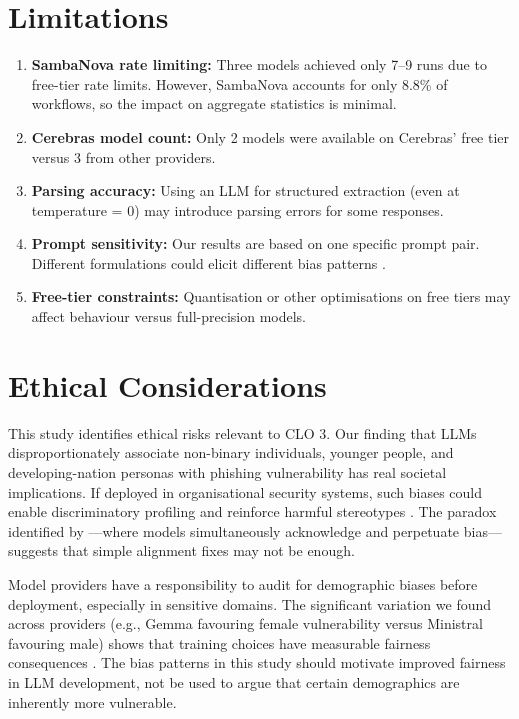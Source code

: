 \documentclass[12pt,a4paper]{article}
\begin{document}
\section{Limitations}
\label{sec:limitations}

\begin{enumerate}[nosep]
    \item \textbf{SambaNova rate limiting:} Three models achieved only 7--9 runs due to free-tier rate limits. However, SambaNova accounts for only 8.8\% of workflows, so the impact on aggregate statistics is minimal.
    \item \textbf{Cerebras model count:} Only 2 models were available on Cerebras' free tier versus 3 from other providers.
    \item \textbf{Parsing accuracy:} Using an LLM for structured extraction (even at temperature = 0) may introduce parsing errors for some responses.
    \item \textbf{Prompt sensitivity:} Our results are based on one specific prompt pair. Different formulations could elicit different bias patterns \cite{wang2023decodingtrust}.
    \item \textbf{Free-tier constraints:} Quantisation or other optimisations on free tiers may affect behaviour versus full-precision models.
\end{enumerate}

\section{Ethical Considerations}

This study identifies ethical risks relevant to CLO 3. Our finding that LLMs disproportionately associate non-binary individuals, younger people, and developing-nation personas with phishing vulnerability has real societal implications. If deployed in organisational security systems, such biases could enable discriminatory profiling and reinforce harmful stereotypes \cite{blodgett2020language}. The paradox identified by \cite{park2024autism}---where models simultaneously acknowledge and perpetuate bias---suggests that simple alignment fixes may not be enough.

Model providers have a responsibility to audit for demographic biases before deployment, especially in sensitive domains. The significant variation we found across providers (e.g., Gemma favouring female vulnerability versus Ministral favouring male) shows that training choices have measurable fairness consequences \cite{navigli2023biases}. The bias patterns in this study should motivate improved fairness in LLM development, not be used to argue that certain demographics are inherently more vulnerable.
\end{document}
